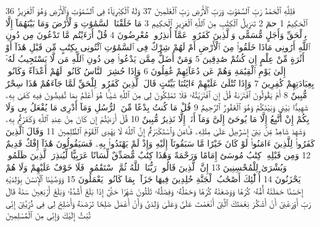 {\tiny\colorbox{cl_aya}{36}} فَلِلَّهِ ٱلْحَمْدُ رَبِّ ٱلسَّمَٰوَٰتِ وَرَبِّ ٱلْأَرْضِ رَبِّ ٱلْعَٰلَمِينَ
{\tiny\colorbox{cl_aya}{37}} وَلَهُ ٱلْكِبْرِيَآءُ فِى ٱلسَّمَٰوَٰتِ وَٱلْأَرْضِ وَهُوَ ٱلْعَزِيزُ ٱلْحَكِيمُ
{\tiny\colorbox{cl_aya}{1}} حمٓ
{\tiny\colorbox{cl_aya}{2}} تَنزِيلُ ٱلْكِتَٰبِ مِنَ ٱللَّهِ ٱلْعَزِيزِ ٱلْحَكِيمِ
{\tiny\colorbox{cl_aya}{3}} مَا خَلَقْنَا ٱلسَّمَٰوَٰتِ وَٱلْأَرْضَ وَمَا بَيْنَهُمَآ إِلَّا بِٱلْحَقِّ وَأَجَلٍ مُّسَمًّى وَٱلَّذِينَ كَفَرُوا۟ عَمَّآ أُنذِرُوا۟ مُعْرِضُونَ
{\tiny\colorbox{cl_aya}{4}} قُلْ أَرَءَيْتُم مَّا تَدْعُونَ مِن دُونِ ٱللَّهِ أَرُونِى مَاذَا خَلَقُوا۟ مِنَ ٱلْأَرْضِ أَمْ لَهُمْ شِرْكٌ فِى ٱلسَّمَٰوَٰتِ ٱئْتُونِى بِكِتَٰبٍ مِّن قَبْلِ هَٰذَآ أَوْ أَثَٰرَةٍ مِّنْ عِلْمٍ إِن كُنتُمْ صَٰدِقِينَ
{\tiny\colorbox{cl_aya}{5}} وَمَنْ أَضَلُّ مِمَّن يَدْعُوا۟ مِن دُونِ ٱللَّهِ مَن لَّا يَسْتَجِيبُ لَهُۥٓ إِلَىٰ يَوْمِ ٱلْقِيَٰمَةِ وَهُمْ عَن دُعَآئِهِمْ غَٰفِلُونَ
{\tiny\colorbox{cl_aya}{6}} وَإِذَا حُشِرَ ٱلنَّاسُ كَانُوا۟ لَهُمْ أَعْدَآءً وَكَانُوا۟ بِعِبَادَتِهِمْ كَٰفِرِينَ
{\tiny\colorbox{cl_aya}{7}} وَإِذَا تُتْلَىٰ عَلَيْهِمْ ءَايَٰتُنَا بَيِّنَٰتٍ قَالَ ٱلَّذِينَ كَفَرُوا۟ لِلْحَقِّ لَمَّا جَآءَهُمْ هَٰذَا سِحْرٌ مُّبِينٌ
{\tiny\colorbox{cl_aya}{8}} أَمْ يَقُولُونَ ٱفْتَرَىٰهُ قُلْ إِنِ ٱفْتَرَيْتُهُۥ فَلَا تَمْلِكُونَ لِى مِنَ ٱللَّهِ شَيْـًٔا هُوَ أَعْلَمُ بِمَا تُفِيضُونَ فِيهِ كَفَىٰ بِهِۦ شَهِيدًۢا بَيْنِى وَبَيْنَكُمْ وَهُوَ ٱلْغَفُورُ ٱلرَّحِيمُ
{\tiny\colorbox{cl_aya}{9}} قُلْ مَا كُنتُ بِدْعًا مِّنَ ٱلرُّسُلِ وَمَآ أَدْرِى مَا يُفْعَلُ بِى وَلَا بِكُمْ إِنْ أَتَّبِعُ إِلَّا مَا يُوحَىٰٓ إِلَىَّ وَمَآ أَنَا۠ إِلَّا نَذِيرٌ مُّبِينٌ
{\tiny\colorbox{cl_aya}{10}} قُلْ أَرَءَيْتُمْ إِن كَانَ مِنْ عِندِ ٱللَّهِ وَكَفَرْتُم بِهِۦ وَشَهِدَ شَاهِدٌ مِّنۢ بَنِىٓ إِسْرَٰٓءِيلَ عَلَىٰ مِثْلِهِۦ فَـَٔامَنَ وَٱسْتَكْبَرْتُمْ إِنَّ ٱللَّهَ لَا يَهْدِى ٱلْقَوْمَ ٱلظَّٰلِمِينَ
{\tiny\colorbox{cl_aya}{11}} وَقَالَ ٱلَّذِينَ كَفَرُوا۟ لِلَّذِينَ ءَامَنُوا۟ لَوْ كَانَ خَيْرًا مَّا سَبَقُونَآ إِلَيْهِ وَإِذْ لَمْ يَهْتَدُوا۟ بِهِۦ فَسَيَقُولُونَ هَٰذَآ إِفْكٌ قَدِيمٌ
{\tiny\colorbox{cl_aya}{12}} وَمِن قَبْلِهِۦ كِتَٰبُ مُوسَىٰٓ إِمَامًا وَرَحْمَةً وَهَٰذَا كِتَٰبٌ مُّصَدِّقٌ لِّسَانًا عَرَبِيًّا لِّيُنذِرَ ٱلَّذِينَ ظَلَمُوا۟ وَبُشْرَىٰ لِلْمُحْسِنِينَ
{\tiny\colorbox{cl_aya}{13}} إِنَّ ٱلَّذِينَ قَالُوا۟ رَبُّنَا ٱللَّهُ ثُمَّ ٱسْتَقَٰمُوا۟ فَلَا خَوْفٌ عَلَيْهِمْ وَلَا هُمْ يَحْزَنُونَ
{\tiny\colorbox{cl_aya}{14}} أُو۟لَٰٓئِكَ أَصْحَٰبُ ٱلْجَنَّةِ خَٰلِدِينَ فِيهَا جَزَآءًۢ بِمَا كَانُوا۟ يَعْمَلُونَ
{\tiny\colorbox{cl_aya}{15}} وَوَصَّيْنَا ٱلْإِنسَٰنَ بِوَٰلِدَيْهِ إِحْسَٰنًا حَمَلَتْهُ أُمُّهُۥ كُرْهًا وَوَضَعَتْهُ كُرْهًا وَحَمْلُهُۥ وَفِصَٰلُهُۥ ثَلَٰثُونَ شَهْرًا حَتَّىٰٓ إِذَا بَلَغَ أَشُدَّهُۥ وَبَلَغَ أَرْبَعِينَ سَنَةً قَالَ رَبِّ أَوْزِعْنِىٓ أَنْ أَشْكُرَ نِعْمَتَكَ ٱلَّتِىٓ أَنْعَمْتَ عَلَىَّ وَعَلَىٰ وَٰلِدَىَّ وَأَنْ أَعْمَلَ صَٰلِحًا تَرْضَىٰهُ وَأَصْلِحْ لِى فِى ذُرِّيَّتِىٓ إِنِّى تُبْتُ إِلَيْكَ وَإِنِّى مِنَ ٱلْمُسْلِمِينَ
